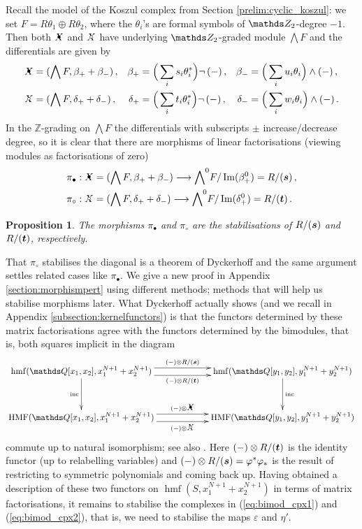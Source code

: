 \documentclass{compositio}
\newtheorem{proposition}[theorem]{Proposition}
\theoremstyle{definition}
\numberwithin{equation}{section}
\def\inc{\operatorname{inc}}
\def\Im{\operatorname{Im}}
\DeclareMathOperator{\hmf}{hmf}
\DeclareMathOperator{\HMF}{HMF}
\begin{document}
Recall the model of the Koszul complex from Section \ref{prelim:cyclic_koszul}: we set $F = R \theta_1 \oplus R \theta_2$, where the $\theta_i$'s are formal symbols of $\Ztwo$-degree $-1$. Then both $\Xbul$ and $\Xcirc$ have underlying $\Ztwo$-graded module $\bigwedge F$ and the differentials are given by
\begin{align*}
\Xbul & = ( \bigwedge F, \beta_+ + \beta_{-}) \, , & \beta_+ & = \Big(\sum_i s_i \theta_i^*\Big) \neg\, (-) \, , & \beta_{-} & = \Big(\sum_i u_i \theta_i\Big) \wedge (-) \, , \\
\Xcirc & = ( \bigwedge F, \delta_+ + \delta_{-}) \, , & \delta_+ & = \Big(\sum_i t_i \theta_i^*\Big) \neg\, (-) \, , & \delta_{-} & = \Big(\sum_i w_i \theta_i\Big) \wedge (-) \, .
\end{align*}
In the $\mathds{Z}$-grading on $\bigwedge F$ the differentials with subscripts $\pm$ increase/decrease degree, so it is clear that there are morphisms of linear factorisations (viewing modules as factorisations of zero)
\begin{align*}
& \pi_{\bullet}: \Xbul = ( \bigwedge F, \beta_+ + \beta_{-}) \lto {\bigwedge}^0 F/\Im(\beta_+^0) = R/(\boldsymbol{s}) \, ,\\
& \pi_{\circ}: \Xcirc = ( \bigwedge F, \delta_+ + \delta_{-}) \lto {\bigwedge}^0 F/\Im(\delta_+^0) = R/(\boldsymbol{t}) \, .
\end{align*}

\begin{proposition} The morphisms $\pi_{\bullet}$ and $\pi_{\circ}$ are the stabilisations of $R/(\boldsymbol{s})$ and $R/(\boldsymbol{t})$, respectively.
\end{proposition}

That $\pi_{\circ}$ stabilises the diagonal is a theorem of Dyckerhoff \cite{d0904.4713} and the same argument settles related cases like $\pi_{\bullet}$. We give a new proof in  Appendix \ref{section:morphismpert} using different methods; methods that will help us stabilise morphisms later. What Dyckerhoff actually shows (and we recall in Appendix \ref{subsection:kernelfunctors}) is that the functors determined by these matrix factorisations agree with the functors determined by the bimodules, that is, both squares implicit in the diagram 
\[
\xymatrix@C+3pc@R+1pc{
\hmf(\QQ[x_1,x_2], x_1^{N+1} + x_2^{N+1})\ar[d]_-{\inc}\ar@<1ex>[r]^-{(-) \otimes R/(\bs{s})}
\ar@<-1ex>[r]_-{(-) \otimes R/(\bs{t})}
& \hmf(\QQ[y_1,y_2], y_1^{N+1} + y_2^{N+1})\ar[d]^-{\inc}\\
\HMF(\QQ[x_1,x_2], x_1^{N+1} + x_2^{N+1})\ar@<1ex>[r]^-{(-) \otimes \Xbul}
\ar@<-1ex>[r]_-{(-) \otimes \Xcirc}
& \HMF(\QQ[y_1,y_2], y_1^{N+1} + y_2^{N+1})
}
\]
commute up to natural isomorphism; see also \cite{b1105.0702}. Here $(-) \otimes R/(\boldsymbol{t})$ is the identity functor (up to relabelling variables) and $(-) \otimes R/(\boldsymbol{s}) = \varphi^* \varphi_*$ is the result of restricting to symmetric polynomials and coming back up. Having obtained a description of these two functors on $\hmf(S, x_1^{N+1} + x_2^{N+1})$ in terms of matrix factorisations, it remains to stabilise the complexes in (\ref{eq:bimod_cpx1}) and (\ref{eq:bimod_cpx2}), that is, we need to stabilise the maps $\varepsilon$ and $\eta'$. 
\end{document}
